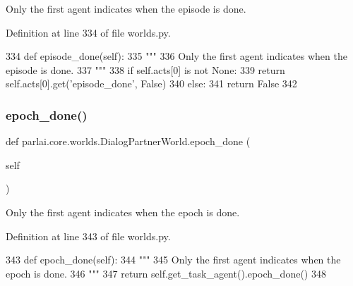 \begin{DoxyVerb}Only the first agent indicates when the episode is done.
\end{DoxyVerb}
 

Definition at line 334 of file worlds.\+py.


\begin{DoxyCode}
334     \textcolor{keyword}{def }episode\_done(self):
335         \textcolor{stringliteral}{"""}
336 \textcolor{stringliteral}{        Only the first agent indicates when the episode is done.}
337 \textcolor{stringliteral}{        """}
338         \textcolor{keywordflow}{if} self.acts[0] \textcolor{keywordflow}{is} \textcolor{keywordflow}{not} \textcolor{keywordtype}{None}:
339             \textcolor{keywordflow}{return} self.acts[0].get(\textcolor{stringliteral}{'episode\_done'}, \textcolor{keyword}{False})
340         \textcolor{keywordflow}{else}:
341             \textcolor{keywordflow}{return} \textcolor{keyword}{False}
342 
\end{DoxyCode}
\mbox{\label{classparlai_1_1core_1_1worlds_1_1DialogPartnerWorld_a4cb1a886df2adc8e469d45652264da36}} 
\subsubsection{\texorpdfstring{epoch\+\_\+done()}{epoch\_done()}}
{\footnotesize\ttfamily def parlai.\+core.\+worlds.\+Dialog\+Partner\+World.\+epoch\+\_\+done (\begin{DoxyParamCaption}\item[{}]{self }\end{DoxyParamCaption})}

\begin{DoxyVerb}Only the first agent indicates when the epoch is done.
\end{DoxyVerb}
 

Definition at line 343 of file worlds.\+py.


\begin{DoxyCode}
343     \textcolor{keyword}{def }epoch\_done(self):
344         \textcolor{stringliteral}{"""}
345 \textcolor{stringliteral}{        Only the first agent indicates when the epoch is done.}
346 \textcolor{stringliteral}{        """}
347         \textcolor{keywordflow}{return} self.get\_task\_agent().epoch\_done()
348 
\end{DoxyCode}
\mbox{\label{classparlai_1_1core_1_1worlds_1_1DialogPartnerWorld_ac3a0c82c725967468208ec10022b6abe}} 
